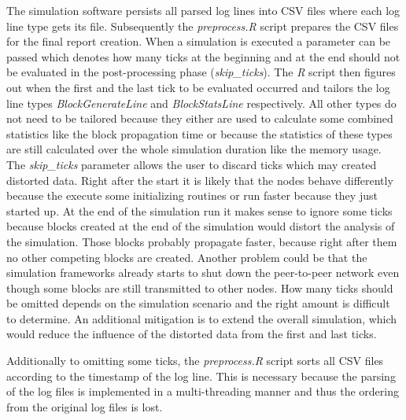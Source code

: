 The simulation software persists all parsed log lines into CSV files where each log line type gets its file.
Subsequently the \textit{preprocess.R} script prepares the CSV files for the final report creation.
When a simulation is executed a parameter can be passed which denotes how many ticks at the beginning and at the end should not be evaluated in the post-processing phase (\textit{skip\_ticks}).
The \textit{R} script then figures out when the first and the last tick to be evaluated occurred and tailors the log line types \textit{BlockGenerateLine} and \textit{BlockStatsLine} respectively.
All other types do not need to be tailored because they either are used to calculate some combined statistics like the block propagation time or because the statistics of these types are still calculated over the whole simulation duration like the memory usage.
The \textit{skip\_ticks} parameter allows the user to discard ticks which may created distorted data.
Right after the start it is likely that the nodes behave differently because the execute some initializing routines or run faster because they just started up.
At the end of the simulation run it makes sense to ignore some ticks because blocks created at the end of the simulation would distort the analysis of the simulation.
Those blocks probably propagate faster, because right after them no other competing blocks are created.
Another problem could be that the simulation frameworks already starts to shut down the peer-to-peer network even though some blocks are still transmitted to other nodes.
How many ticks should be omitted depends on the simulation scenario and the right amount is difficult to determine.
An additional mitigation is to extend the overall simulation, which would reduce the influence of the distorted data from the first and last ticks.

Additionally to omitting some ticks, the \textit{preprocess.R} script sorts all CSV files according to the timestamp of the log line.
This is necessary because the parsing of the log files is implemented in a multi-threading manner and thus the ordering from the original log files is lost.

